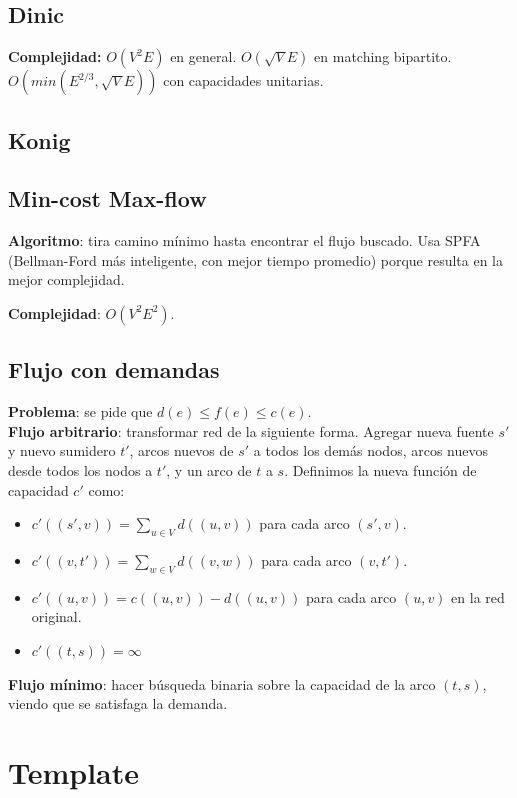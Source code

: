 {\subsection{Dinic}
\textbf{Complejidad: } $O(V^2E)$ en general. $O(\sqrt{V}E)$ en matching bipartito. $O(min(E^{2/3}, \sqrt{V}E))$ con capacidades unitarias.

\subsection{Konig}

\subsection{Min-cost Max-flow}
\textbf{Algoritmo}: tira camino mínimo hasta encontrar el flujo buscado. Usa SPFA (Bellman-Ford más inteligente, con mejor
tiempo promedio) porque resulta en la mejor complejidad.

\textbf{Complejidad}: $O(V^2E^2)$.

\subsection{Flujo con demandas}
\textbf{Problema}: se pide que $d(e) \leq f(e) \leq c(e)$. \\
\textbf{Flujo arbitrario}: transformar red de la siguiente forma. Agregar nueva fuente $s'$ y nuevo sumidero $t'$,
arcos nuevos de $s'$ a todos los demás nodos, arcos nuevos desde todos los nodos a $t'$, y un arco de $t$ a $s$.
Definimos la nueva función de capacidad $c'$ como:
\begin{itemize}
\item $c'((s',v)) = \sum\nolimits_{u \in V} d((u,v))$ para cada arco $(s',v)$.
\item $c'((v,t')) = \sum\nolimits_{w \in V} d((v,w))$ para cada arco $(v,t')$.
\item $c'((u,v)) = c((u,v)) - d((u,v))$ para cada arco $(u,v)$ en la red original.
\item $c'((t,s)) = \infty$
\end{itemize}
\textbf{Flujo mínimo}: hacer búsqueda binaria sobre la capacidad de la arco $(t, s)$, viendo que se satisfaga la demanda.

\section{Template}%

}
